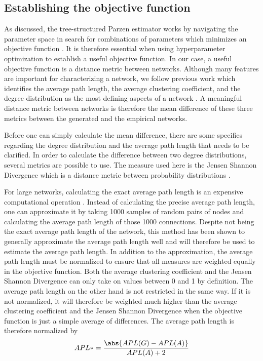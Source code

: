 \documentclass[11pt]{article}
\DeclarePairedDelimiter{\abs}\lvert\rvert
\begin{document}
\subsection{Establishing the objective function}
As discussed, the tree-structured Parzen estimator works by navigating the parameter space in search for combinations of parameters which minimizes an objective function \cite{akiba_optuna_2019}. It is therefore essential when using hyperparameter optimization to establish a useful objective function. In our case, a useful objective function is a distance metric between networks. Although many features are important for characterizing a network, we follow previous work which identifies the average path length, the average clustering coefficient, and the degree distribution as the most defining aspects of a network \cite{jacksonsearch2004, jacksonmeeting2007}. A meaningful distance metric between networks is therefore the mean difference of these three metrics between the generated and the empirical networks.

\noindent Before one can simply calculate the mean difference, there are some specifics regarding the degree distribution and the average path length that needs to be clarified.
In order to calculate the difference between two degree distributions, several metrics are possible to use. The measure used here is the Jensen Shannon Divergence which is a distance metric between probability distributions \cite{fuglede_jensen-shannon_2004}. 

For large networks, calculating the exact average path length is an expensive computational operation  \cite{matsumura_average_2018}. Instead of calculating the precise average path length, one can approximate it by taking 1000 samples of random pairs of nodes and calculating the average path length of those 1000 connections. Despite not being the exact average path length of the network, this method has been shown to generally approximate the average path length well \cite{matsumura_average_2018} and will therefore be used to estimate the average path length. 
In addition to the approximation, the average path length must be normalized to ensure that all measures are weighted equally in the objective function. Both the average clustering coefficient and the Jensen Shannon Divergence can only take on values between 0 and 1 by definition. The average path length on the other hand is not restricted in the same way. If it is not normalized, it will therefore be weighted much higher than the average clustering coefficient and the Jensen Shannon Divergence when the objective function is just a simple average of differences. The average path length is therefore normalized by 
\vspace{3mm}
$$APL* = \frac{\abs{APL(G) - APL(A)}}{APL(A)+2}$$
\end{document}
